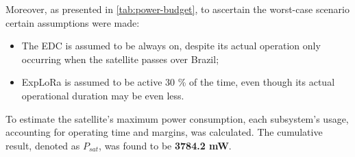 
Moreover, as presented in \autoref{tab:power-budget}, to ascertain the worst-case scenario certain assumptions were made:

\begin{itemize}
    \item The \ac{EDC} is assumed to be always on, despite its actual operation only occurring when the satellite passes over Brazil;
    \item ExpLoRa is assumed to be active 30 \% of the time, even though its actual operational duration may be even less.
\end{itemize}

To estimate the satellite's maximum power consumption, each subsystem's usage, accounting for operating time and margins, was calculated. The cumulative result, denoted as $P_{sat}$, was found to be \textbf{3784.2 mW}.

